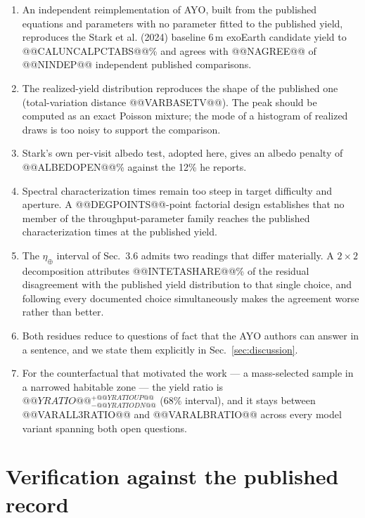\documentclass[11pt,a4paper]{article}
\begin{document}
\begin{enumerate}
\item An independent reimplementation of AYO, built from the published equations and parameters
  with no parameter fitted to the published yield, reproduces the Stark et al. (2024) baseline
  $6\,$m exoEarth candidate yield to @@CALUNCALPCTABS@@\% and agrees with @@NAGREE@@ of
  @@NINDEP@@ independent published comparisons.
\item The realized-yield distribution reproduces the shape of the published one (total-variation
  distance @@VARBASETV@@). The peak should be computed as an exact Poisson mixture; the mode of a
  histogram of realized draws is too noisy to support the comparison.
\item Stark's own per-visit albedo test, adopted here, gives an albedo penalty of @@ALBEDOPEN@@\%
  against the 12\% he reports.
\item Spectral characterization times remain too steep in target difficulty and aperture. A
  @@DEGPOINTS@@-point factorial design establishes that no member of the throughput-parameter
  family reaches the published characterization times at the published yield.
\item The $\eta_\oplus$ interval of Sec.~3.6 admits two readings that differ materially. A
  $2\times2$ decomposition attributes @@INTETASHARE@@\% of the residual disagreement with the
  published yield distribution to that single choice, and following every documented choice
  simultaneously makes the agreement worse rather than better.
\item Both residues reduce to questions of fact that the AYO authors can answer in a sentence, and
  we state them explicitly in Sec.~\ref{sec:discussion}.
\item For the counterfactual that motivated the work --- a mass-selected sample in a narrowed
  habitable zone --- the yield ratio is $@@YRATIO@@^{+@@YRATIOUP@@}_{-@@YRATIODN@@}$ (68\%
  interval), and it stays between @@VARALL3RATIO@@ and @@VARALBRATIO@@ across every model variant
  spanning both open questions.
\end{enumerate}

\appendix
\section{Verification against the published record}
\label{app:verification}
\end{document}
